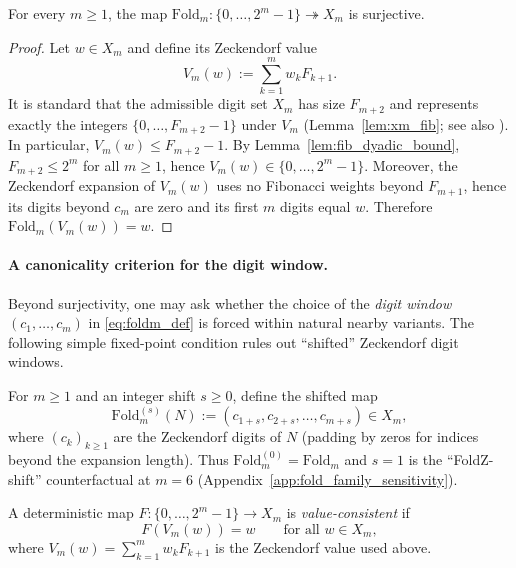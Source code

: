\begin{proposition}\label{prop:foldm_surjective}
For every $m\ge 1$, the map $\mathrm{Fold}_m:\{0,\dots,2^m-1\}\twoheadrightarrow X_m$ is surjective.
\end{proposition}
\begin{proof}
Let $w\in X_m$ and define its Zeckendorf value
\[
V_m(w):=\sum_{k=1}^{m} w_k F_{k+1}.
\]
It is standard that the admissible digit set $X_m$ has size $F_{m+2}$ and represents exactly the integers $\{0,\dots,F_{m+2}-1\}$ under $V_m$ (Lemma~\ref{lem:xm_fib}; see also \cite{Zeckendorf1972,AlloucheShallit2003,DemontignyEtAl2013FDecompositions,BenAriMiller2014ProbabilisticZeckendorf,Dekking2020StructureZeckendorf}).
In particular, $V_m(w)\le F_{m+2}-1$.
By Lemma~\ref{lem:fib_dyadic_bound}, $F_{m+2}\le 2^m$ for all $m\ge 1$, hence $V_m(w)\in\{0,\dots,2^m-1\}$.
Moreover, the Zeckendorf expansion of $V_m(w)$ uses no Fibonacci weights beyond $F_{m+1}$, hence its digits beyond $c_m$ are zero and its first $m$ digits equal $w$.
Therefore $\mathrm{Fold}_m(V_m(w))=w$.
\end{proof}

\paragraph{A canonicality criterion for the digit window.}
Beyond surjectivity, one may ask whether the choice of the \emph{digit window}
$(c_1,\ldots,c_m)$ in \eqref{eq:foldm_def} is forced within natural nearby
variants.
The following simple fixed-point condition rules out ``shifted'' Zeckendorf
digit windows.

\begin{definition}
\label{def:foldm_shifted}
For $m\ge 1$ and an integer shift $s\ge 0$, define the shifted map
\[
\mathrm{Fold}_{m}^{(s)}(N):=(c_{1+s},c_{2+s},\ldots,c_{m+s})\in X_m,
\]
where $(c_k)_{k\ge 1}$ are the Zeckendorf digits of $N$ (padding by zeros for
indices beyond the expansion length).
Thus $\mathrm{Fold}_{m}^{(0)}=\mathrm{Fold}_m$ and $s=1$ is the ``FoldZ-shift''
counterfactual at $m=6$ (Appendix~\ref{app:fold_family_sensitivity}).
\end{definition}

\begin{definition}
\label{def:value_consistency_m}
A deterministic map $F:\{0,\ldots,2^m-1\}\to X_m$ is \emph{value-consistent} if
\[
F(V_m(w))=w\qquad\text{for all }w\in X_m,
\]
where $V_m(w)=\sum_{k=1}^m w_k F_{k+1}$ is the Zeckendorf value used above.
\end{definition}

